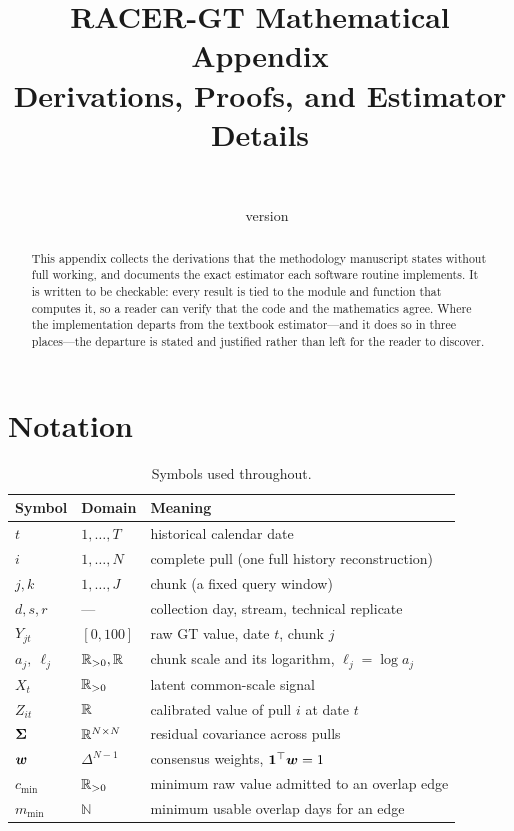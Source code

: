 \documentclass[12pt,a4paper,oneside]{article}
\title{\bfseries RACER-GT Mathematical Appendix\\[0.4em]
\large Derivations, Proofs, and Estimator Details}
\author{\racerauthor\\\small \raceraffil}
\date{\racerdate\ \textbullet\ version \racerversion}
\begin{document}
\maketitle

\begin{abstract}
\noindent This appendix collects the derivations that the methodology
manuscript states without full working, and documents the exact estimator each
software routine implements. It is written to be checkable: every result is
tied to the module and function that computes it, so a reader can verify that
the code and the mathematics agree. Where the implementation departs from the
textbook estimator---and it does so in three places---the departure is stated
and justified rather than left for the reader to discover.
\end{abstract}

\tableofcontents
\newpage

\section{Notation}

\begin{table}[H]
\centering
\small
\caption{Symbols used throughout.}
\begin{tabularx}{\textwidth}{llX}
\toprule
Symbol & Domain & Meaning\\
\midrule
$t$ & $1,\dots,T$ & historical calendar date\\
$i$ & $1,\dots,N$ & complete pull (one full history reconstruction)\\
$j,k$ & $1,\dots,J$ & chunk (a fixed query window)\\
$d,s,r$ & --- & collection day, stream, technical replicate\\
$Y_{jt}$ & $[0,100]$ & raw GT value, date $t$, chunk $j$\\
$a_j,\ \ell_j$ & $\mathbb{R}_{>0},\mathbb{R}$ & chunk scale and its logarithm, $\ell_j=\log a_j$\\
$X_t$ & $\mathbb{R}_{>0}$ & latent common-scale signal\\
$Z_{it}$ & $\mathbb{R}$ & calibrated value of pull $i$ at date $t$\\
$\bm{\Sigma}$ & $\mathbb{R}^{N\times N}$ & residual covariance across pulls\\
$\bm{w}$ & $\Delta^{N-1}$ & consensus weights, $\bm{1}^\top\bm{w}=1$\\
$c_{\min}$ & $\mathbb{R}_{>0}$ & minimum raw value admitted to an overlap edge\\
$m_{\min}$ & $\mathbb{N}$ & minimum usable overlap days for an edge\\
\bottomrule
\end{tabularx}
\end{table}
\end{document}
